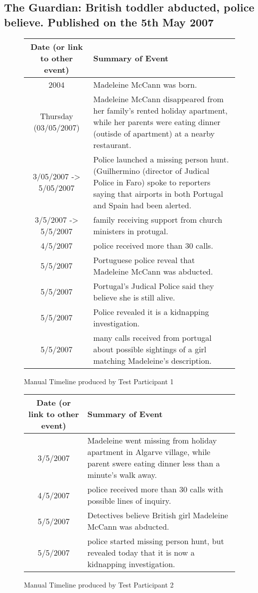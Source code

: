 \subsection{The Guardian: British toddler abducted, police believe. Published on the 5th May 2007}
\begin{figure}[H]
\begin{tabular}{|c|p{7cm}|}
\hline
Date (or link to other event) & Summary of Event\\
\hline
\hline
2004 & Madeleine McCann was born.\\
\hline
Thursday (03/05/2007) & Madeleine McCann disappeared from her family's rented holiday apartment, while her parents were eating dinner (outisde of apartment) at a nearby restaurant.\\
\hline
3/05/2007 -> 5/05/2007 & Police launched a missing person hunt. (Guilhermino (director of Judical Police in Faro) spoke to reporters saying that airports in both Portugal and Spain had been alerted.\\
\hline
3/5/2007 -> 5/5/2007 & family receiving support from church ministers in protugal.\\
\hline
4/5/2007 & police received more than 30 calls.\\
\hline
5/5/2007 & Portuguese police reveal that Madeleine McCann was abducted.\\
\hline
5/5/2007 & Portugal's Judical Police said they believe she is still alive.\\
\hline
5/5/2007 & Police revealed it is a kidnapping investigation.\\
\hline
5/5/2007 & many calls received from portugal about possible sightings of a girl matching Madeleine's description.\\
\hline
\end{tabular}
\caption{Manual Timeline produced by Test Participant 1}
\end{figure}

\begin{figure}[H]
\begin{tabular}{|c|p{7cm}|}
\hline
Date (or link to other event) & Summary of Event\\
\hline
\hline
3/5/2007 & Madeleine went missing from holiday apartment in Algarve village, while parent swere eating dinner less than a minute's walk away.\\
\hline
4/5/2007 & police received more than 30 calls  with possible lines of inquiry.\\
\hline
5/5/2007 & Detectives believe British girl Madeleine McCann was abducted.\\
\hline
5/5/2007 & police started missing person hunt, but revealed today that it is now a kidnapping investigation.\\
\hline
\end{tabular}
\caption{Manual Timeline produced by Test Participant 2}
\end{figure}

